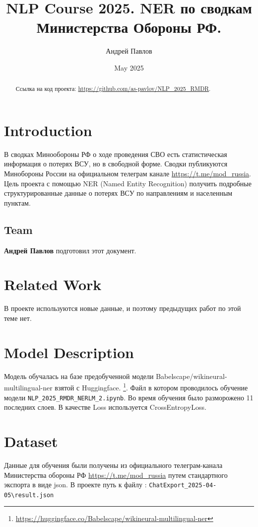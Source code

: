 \documentclass{article}
\title{NLP Course 2025. NER по сводкам Министерства Обороны РФ.
}
\author{Андрей Павлов}
\date{May 2025}
\begin{document}
\maketitle
\begin{abstract}
    Ссылка на код проекта: \url{https://github.com/as-pavlov/NLP_2025_RMDR}.
\end{abstract}



\section{Introduction}
В сводках Минообороны РФ о ходе проведения СВО есть статистическая информация о потерях ВСУ, но в свободной форме. Сводки публикуются Минобороны России  на официальном телеграм канале \url{https://t.me/mod_russia}.  Цель проекта с помощью NER (Named Entity Recognition) получить подробные структурированные данные о потерях ВСУ по направлениям и населенным пунктам.
\subsection{Team}

\textbf{Андрей Павлов} подготовил этот документ.



\section{Related Work}
\label{sec:related}
В проекте используются новые данные, и поэтому предыдущих работ по этой теме нет. 



\section{Model Description}
Модель обучалась на базе предобученной модели  Babelscape/wikineural-multilingual-ner взятой с Huggingface. \footnote{ \cite{BSWMN} \url{https://huggingface.co/Babelscape/wikineural-multilingual-ner}}. Файл в котором проводилось обучение модели \verb|NLP_2025_RMDR_NERLM_2.ipynb|. Во время обучения было разморожено 11 последних слоев. В качестве Loss используется CrossEntropyLoss. \cite{NERUB} \cite{HFTC}





\section{Dataset}
Данные для обучения были получены из официального телеграм-канала Министерства обороны РФ \url{https://t.me/mod_russia} путем стандартного экспорта в виде json. В проекте путь к файлу : \verb|ChatExport_2025-04-05\result.json|
\end{document}
